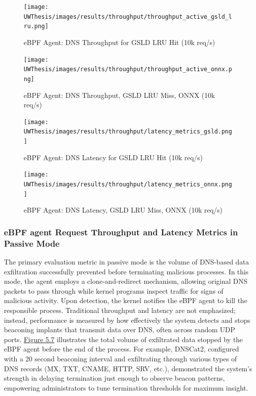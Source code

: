 \documentclass [11pt, proquest] {uwthesis}[2020/02/24]
\begin{document}
\begin{figure}[H]
  \centering
  \begin{minipage}[t]{0.47\textwidth}
    \centering
    \texttt{[image: UWThesis/images/results/throughput/throughput\_active\_gsld\_lru.png]}
    \caption{eBPF Agent: DNS Throughput for GSLD LRU Hit (10k req/s)}
    \label{fig:throughput_gsld}
  \end{minipage}
  \hfill
  \begin{minipage}[t]{0.47\textwidth}
    \centering
    \texttt{[image: UWThesis/images/results/throughput/throughput\_active\_onnx.png]}
    \caption{eBPF Agent: DNS Throughput, GSLD LRU Miss, ONNX (10k req/s)}
    \label{fig:throughput_onnx}
  \end{minipage}

  \vspace{1cm} %

  \begin{minipage}[t]{0.47\textwidth}
    \centering
    \texttt{[image: UWThesis/images/results/throughput/latency\_metrics\_gsld.png]}
    \caption{eBPF Agent: DNS Latency for GSLD LRU Hit (10k req/s)}
    \label{fig:latency_gsld}
  \end{minipage}
  \hfill
  \begin{minipage}[t]{0.47\textwidth}
    \centering
    \texttt{[image: UWThesis/images/results/throughput/latency\_metrics\_onnx.png]}
    \caption{eBPF Agent: DNS Latency, GSLD LRU Miss, ONNX (10k req/s)}
    \label{fig:latency_onnx}
  \end{minipage}
\end{figure}

\subsubsection{eBPF agent Request Throughput and Latency Metrics in Passive Mode}
The primary evaluation metric in passive mode is the volume of DNS-based data exfiltration successfully prevented before terminating malicious processes. In this mode, the agent employs a clone-and-redirect mechanism, allowing original DNS packets to pass through while kernel programs inspect traffic for signs of malicious activity. Upon detection, the kernel notifies the eBPF agent to kill the responsible process. Traditional throughput and latency are not emphasized; instead, performance is measured by how effectively the system detects and stops beaconing implants that transmit data over DNS, often across random UDP ports. \hyperref[fig:data_loss_prev]{Figure 5.7} illustrates the total volume of exfiltrated data stopped by the eBPF agent before the end of the process. For example, DNSCat2, configured with a 20 second beaconing interval and exfiltrating through various types of DNS records (MX, TXT, CNAME, HTTP, SRV, etc.), demonstrated the system’s strength in delaying termination just enough to observe beacon patterns, empowering administrators to tune termination thresholds for maximum insight.
\end{document}
